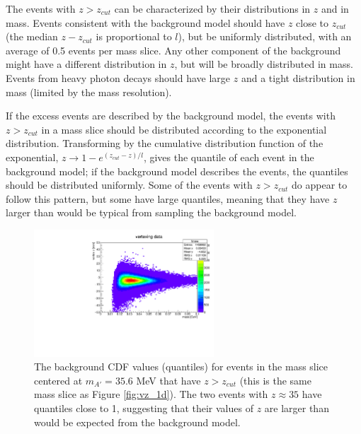 The events with $z>z_{cut}$ can be characterized by their distributions in $z$ and in mass.
Events consistent with the background model should have $z$ close to $z_{cut}$ (the median $z-z_{cut}$ is proportional to $l$), but be uniformly distributed, with an average of 0.5 events per mass slice.
Any other component of the background might have a different distribution in $z$, but will be broadly distributed in mass.
Events from heavy photon decays should have large $z$ and a tight distribution in mass (limited by the mass resolution).

If the excess events are described by the background model, the events with $z>z_{cut}$ in a mass slice should be distributed according to the exponential distribution.
Transforming by the cumulative distribution function of the exponential, $z\to 1-e^{(z_{cut}-z)/l}$, gives the quantile of each event in the background model; if the background model describes the events, the quantiles should be distributed uniformly.
Some of the events with $z>z_{cut}$ do appear to follow this pattern, but some have large quantiles, meaning that they have $z$ larger than would be typical from sampling the background model.

\begin{figure}[ht]
\begin{center}
    \includegraphics[width=0.6\textwidth,page=60,angle=-90]{vertexing/figs/golden_mres}
\end{center}
\caption{The background CDF values (quantiles) for events in the mass slice centered at $m_{A'}=35.6$ MeV that have $z>z_{cut}$ (this is the same mass slice as Figure \ref{fig:vz_1d}).
The two events with $z\approx 35$ have quantiles close to 1, suggesting that their values of $z$ are larger than would be expected from the background model.}
    \label{fig:candidates_rescaled}
\end{figure}

